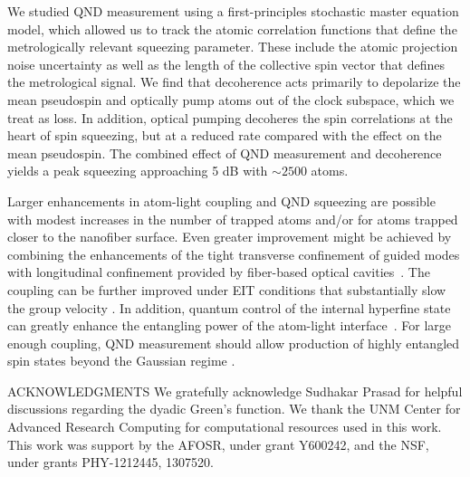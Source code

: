 \documentclass[aps,pra,twocolumn]{revtex4-1} %
\begin{document}
We studied QND measurement using a first-principles stochastic master equation model, which allowed us to track the atomic correlation functions that define the metrologically relevant squeezing parameter.  
These include the atomic projection noise uncertainty as well as the length of the collective spin vector that defines the metrological signal.  We find that decoherence acts primarily to depolarize the mean pseudospin and optically pump atoms out of the clock subspace, which we treat as loss.  In addition, optical pumping decoheres the spin correlations at the heart of spin squeezing, but at a reduced rate compared with the effect on the mean pseudospin.  
The combined effect of QND measurement and decoherence yields a peak squeezing approaching 5 dB with $\sim 2500$ atoms. 

Larger enhancements in atom-light coupling and QND squeezing are possible with modest increases in the number of trapped atoms and/or for atoms trapped closer to the nanofiber surface.  
Even greater improvement might be achieved by combining the enhancements of the tight transverse confinement of guided modes with longitudinal confinement provided by fiber-based optical cavities~\cite{le_kien_intracavity_2009, wuttke_nanofiber_2012, yalla_cavity_2014, bohnet_reduced_2014,nayak_optical_2014}.  
The coupling can be further improved under EIT conditions that substantially slow the group velocity \cite{gouraud_demonstration_2015, sayrin_storage_2015, kumar_autler-townes_2015, le_kien_electromagnetically_2015}. 
In addition, quantum control of the internal hyperfine state \cite{smith_quantum_2013-1} can greatly enhance the entangling power of the atom-light interface~\cite{trail_strongly_2010, norris_enhanced_2012}. 
For large enough coupling, QND measurement should allow production of highly entangled spin states beyond the Gaussian regime \cite{stockton_deterministic_2004, mcconnell_entanglement_2015}.

ACKNOWLEDGMENTS 
We gratefully acknowledge Sudhakar Prasad for helpful discussions regarding the dyadic Green's function. 
We thank the UNM Center for Advanced Research Computing for computational resources used in this work. 
This work was support by the AFOSR, under grant Y600242, and the NSF, under grants PHY-1212445, 1307520. 
%
%


\end{document}
